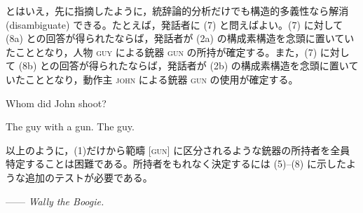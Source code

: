 \documentclass[oneside,dvipdfmx,tikz]{jsarticle}
\begin{document}
とはいえ，先に指摘したように，統辞論的分析だけでも構造的多義性なら解消 (disambiguate) できる。たとえば，発話者に (7) と問えばよい。(7) に対して (8a) との回答が得られたならば，発話者が (2a) の構成素構造を念頭に置いていたこととなり，人物 \textsc{guy} による銃器 \textsc{gun} の所持が確定する。また，(7) に対して (8b) との回答が得られたならば，発話者が (2b) の構成素構造を念頭に置いていたこととなり，動作主 \textsc{john} による銃器 \textsc{gun} の使用が確定する。

\begin{exe}
	\ex Whom did John shoot?
	\ex 
	\begin{xlist}
	\ex The guy with a gun.
	\ex The guy.
	\end{xlist}
\end{exe}

以上のように，(1)だけから範疇 \textsc{[gun]} に区分されるような銃器の所持者を全員特定することは困難である。所持者をもれなく決定するには (5)--(8) に示したような追加のテストが必要である。

\begin{flushright}
---\!--- \textit{Wally the Boogie.}
\end{flushright}
\end{document}
